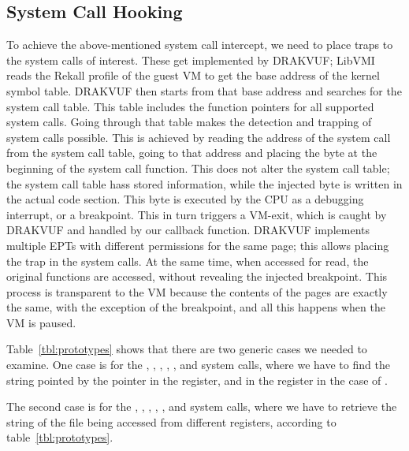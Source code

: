 \begin{table}[ht]
\begin{tabular}{ccccccc}
	\bottomrule
\end{tabular}
\end{table}

\subsection{System Call Hooking}\label{sub:hooking}

To achieve the above-mentioned system call intercept, we need to place traps to the system calls of interest. These get implemented by DRAKVUF; LibVMI reads the Rekall profile of the guest \ac{VM} to get the base address of the kernel symbol table. DRAKVUF then starts from that base address and searches for the system call table. This table includes the function pointers for all supported system calls. Going through that table makes the detection and trapping of system calls possible. This is achieved by reading the address of the system call from the system call table, going to that address and placing the  byte at the beginning of the system call function. This does not alter the system call table; the system call table hass stored information, while the injected byte is written in the actual code section. This byte is executed by the \ac{CPU} as a debugging interrupt, or a breakpoint. This in turn triggers a VM-exit, which is caught by DRAKVUF and handled by our callback function. DRAKVUF implements multiple \ac{EPT}s with different permissions for the same page; this allows placing the trap in the system calls. At the same time, when accessed for read, the original functions are accessed, without revealing the injected breakpoint. This process is transparent to the \ac{VM} because the contents of the pages are exactly the same, with the exception of the breakpoint, and all this happens when the \ac{VM} is paused.

\par Table~\ref{tbl:prototypes} shows that there are two generic cases we needed to examine. One case is for the , , , , , and  system calls, where we have to find the string pointed by the pointer in the  register, and in the  register in the case of . 

\par The second case is for the , , , , , and  system calls, where we have to retrieve the string of the file being accessed from different registers, according to table~\ref{tbl:prototypes}. 


